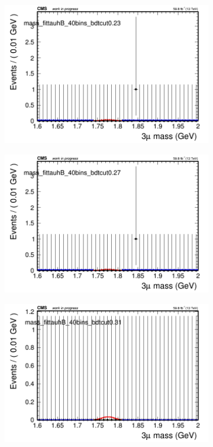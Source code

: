 \begin{figure}[H]
\begin{subfigure}{0.2\textwidth}
        \caption{}
    \end{subfigure}
    \begin{subfigure}{0.2\textwidth}
        \includegraphics[width=\textwidth]{flat_fit/plots/tauhB/massfit_tauhB_40bins_bdtcut0.23.png}
        \caption{}
    \end{subfigure}
    \begin{subfigure}{0.2\textwidth}
        \includegraphics[width=\textwidth]{flat_fit/plots/tauhB/massfit_tauhB_40bins_bdtcut0.27.png}
        \caption{}
    \end{subfigure}
    \begin{subfigure}{0.2\textwidth}
        \includegraphics[width=\textwidth]{flat_fit/plots/tauhB/massfit_tauhB_40bins_bdtcut0.31.png}

\end{subfigure}
\end{figure}
